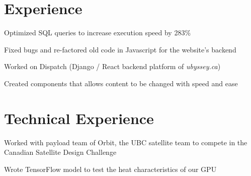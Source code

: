 \documentclass[]{deedy-resume-openfont}
\begin{document}
%
%

%
%



\section{Experience}

\begin{tightemize}
\item Optimized SQL queries to increase execution speed by 283\%
\item Fixed bugs and re-factored old code in Javascript for the website’s backend
\end{tightemize}
\sectionsep

\begin{tightemize}
\item Worked on Dispatch (Django / React backend platform of \textit{ubyssey.ca})
\item Created components that allows content to be changed with speed and ease
\end{tightemize}
\sectionsep

\section{Technical Experience}

\begin{tightemize}
\item Worked with payload team of Orbit, the UBC satellite team to compete in the \linebreak Canadian Satellite Design Challenge 
\item Wrote TensorFlow model to test the heat characteristics of our GPU 
\end{tightemize}
\sectionsep
\end{document}
